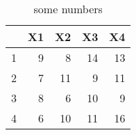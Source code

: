 \begin{table}[ht]
\centering
\begin{tabular}{rrrrr}
  \hline
 & X1 & X2 & X3 & X4 \\ 
  \hline
1 &   9 &   8 &  14 &  13 \\ 
  2 &   7 &  11 &   9 &  11 \\ 
  3 &   8 &   6 &  10 &   9 \\ 
  4 &   6 &  10 &  11 &  16 \\ 
   \hline
\end{tabular}
\caption{some numbers} 
\label{t1}
\end{table}